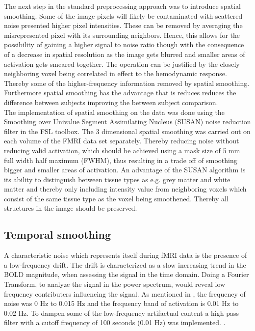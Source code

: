 The next step in the standard preprocessing approach was to introduce spatial smoothing. Some of the image pixels will likely be contaminated with scattered noise presented higher pixel intensities. These can be removed by averaging the misrepresented pixel with its surrounding neighbors. Hence, this allows for the possibility of gaining a higher signal to noise ratio though with the consequence of a decrease in spatial resolution as the image gets blurred and smaller areas of activation gets smeared together. The operation can be justified by the closely neighboring voxel being correlated in effect to the hemodynamic response. Thereby some of the higher-frequency information removed by spatial smoothing. Furthermore spatial smoothing has the advantage that is reduces reduces the difference between subjects improving the between subject comparison. \cite{Poldrack2011} \\
The implementation of spatial smoothing on the data was done using the Smoothing over Univalue Segment Assimilating Nucleus (SUSAN) noise reduction filter in the FSL toolbox. The 3 dimensional spatial smoothing was carried out on each volume of the FMRI data set separately. Thereby reducing noise without reducing valid activation, which should be achieved using a mask size of 5 mm full width half maximum (FWHM), thus resulting in a trade off of smoothing bigger and smaller areas of activation. An advantage of the SUSAN algorithm is its ability to distinguish between tissue types as e.g. grey matter and white matter and thereby only including intensity value from neighboring voxels which consist of the same tissue type as the voxel being smoothened. Thereby all structures in the image should be preserved. \cite{Smith1997}  


\subsection{Temporal smoothing}

A characteristic noise which represents itself during fMRI data is the presence of a low-frequency drift. The drift is characterized as a slow increasing trend in the BOLD magnitude, when assessing the signal in the time domain. Doing a Fourier Transform, to analyze the signal in the power spectrum, would reveal low frequency contributers influencing the signal. As mentioned in , the frequency of noise was 0 Hz to 0.015 Hz and the frequency band of activation is 0.01 Hz to 0.02 Hz. To dampen some of the low-frequency artifactual content a high pass filter with a cutoff frequency of 100 seconds (0.01 Hz) was implemented. \cite{FMRIB2018}. \\


